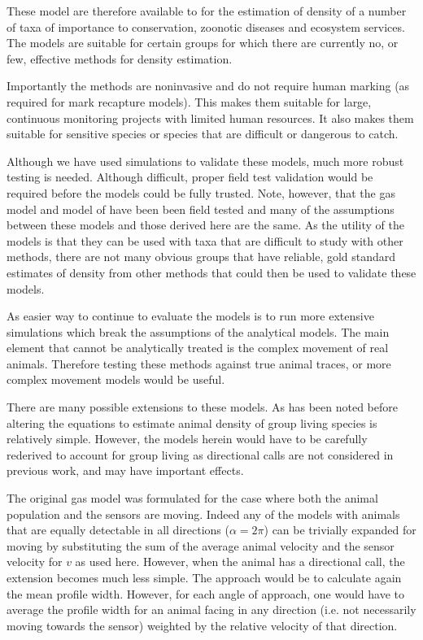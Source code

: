 \documentclass[a4paper,10pt,reqno,oneside]{amsart}
\begin{document}
These model are therefore available to for the estimation of density of a number of taxa of importance to conservation, zoonotic diseases and ecosystem services. The models are suitable for certain groups for which there are currently no, or few, effective methods for density estimation. 

Importantly the methods are noninvasive and do not require human marking (as required for mark recapture models). This makes them suitable for large, continuous monitoring projects with limited human resources. It also makes them suitable for sensitive species or species that are difficult or dangerous to catch.

Although we have used simulations to validate these models, much more robust testing is needed. Although difficult, proper field test validation would be required before the models could be fully trusted. Note, however, that the gas model and model of \cite{rowcliffe2008estimating} have been been field tested and many of the assumptions between these models and those derived here are the same. As the utility of the models is that they can be used with taxa that are difficult to study with other methods, there are not many obvious groups that have reliable, gold standard estimates of density from other methods that could then be used to validate these models.

As easier way to continue to evaluate the models is to run more extensive simulations which break the assumptions of the analytical models. The main element that cannot be analytically treated is the complex movement of real animals. Therefore testing these methods against true animal traces, or more complex movement models would be useful.

There are many possible extensions to these models. As has been noted before \citep{rowcliffe2008estimating,Hutchinson_Waser_2007} altering the equations to estimate animal density of group living species is relatively simple. However, the models herein would have to be carefully rederived to account for group living as directional calls are not considered in previous work, and may have important effects.

The original gas model was formulated for the case where both the animal population and the sensors are moving. Indeed any of the models with animals that are equally detectable in all directions ($\alpha = 2\pi$) can be trivially expanded for moving by substituting the sum of the average animal velocity and the sensor velocity for $v$ as used here. However, when the animal has a directional call, the extension becomes much less simple. The approach would be to calculate again the mean profile width. However, for each angle of approach, one would have to average the profile width for an animal facing in any direction (i.e. not necessarily moving towards the sensor) weighted by the relative velocity of that direction.
\end{document}
